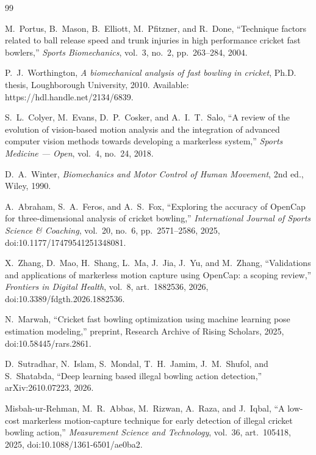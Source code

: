\documentclass[11pt,a4paper]{article}
\begin{document}
\renewcommand{\refname}{\arabic{section}\quad References}
\begin{thebibliography}{99}

M.~Portus, B.~Mason, B.~Elliott, M.~Pfitzner, and R.~Done,
``Technique factors related to ball release speed and trunk injuries in high
performance cricket fast bowlers,''
\emph{Sports Biomechanics}, vol.~3, no.~2, pp.~263--284, 2004.

P.~J.~Worthington,
\emph{A biomechanical analysis of fast bowling in cricket},
Ph.D. thesis, Loughborough University, 2010. Available:
https://hdl.handle.net/2134/6839.

S.~L.~Colyer, M.~Evans, D.~P.~Cosker, and A.~I.~T.~Salo,
``A review of the evolution of vision-based motion analysis and the
integration of advanced computer vision methods towards developing a markerless
system,''
\emph{Sports Medicine --- Open}, vol.~4, no.~24, 2018.

D.~A.~Winter,
\emph{Biomechanics and Motor Control of Human Movement},
2nd ed., Wiley, 1990.

A.~Abraham, S.~A.~Feros, and A.~S.~Fox,
``Exploring the accuracy of OpenCap for three-dimensional analysis of cricket
bowling,''
\emph{International Journal of Sports Science \& Coaching}, vol.~20, no.~6,
pp.~2571--2586, 2025, doi:10.1177/17479541251348081.

X.~Zhang, D.~Mao, H.~Shang, L.~Ma, J.~Jia, J.~Yu, and M.~Zhang,
``Validations and applications of markerless motion capture using OpenCap: a
scoping review,''
\emph{Frontiers in Digital Health}, vol.~8, art.~1882536, 2026,
doi:10.3389/fdgth.2026.1882536.

N.~Marwah,
``Cricket fast bowling optimization using machine learning pose estimation
modeling,'' preprint, Research Archive of Rising Scholars, 2025,
doi:10.58445/rars.2861.

D.~Sutradhar, N.~Islam, S.~Mondal, T.~H.~Jamim, J.~M.~Shufol, and
S.~Shatabda,
``Deep learning based illegal bowling action detection,''
arXiv:2610.07223, 2026.

Misbah-ur-Rehman, M.~R.~Abbas, M.~Rizwan, A.~Raza, and J.~Iqbal,
``A low-cost markerless motion-capture technique for early detection of
illegal cricket bowling action,''
\emph{Measurement Science and Technology}, vol.~36, art.~105418, 2025,
doi:10.1088/1361-6501/ae0ba2.


\end{thebibliography}
\end{document}
